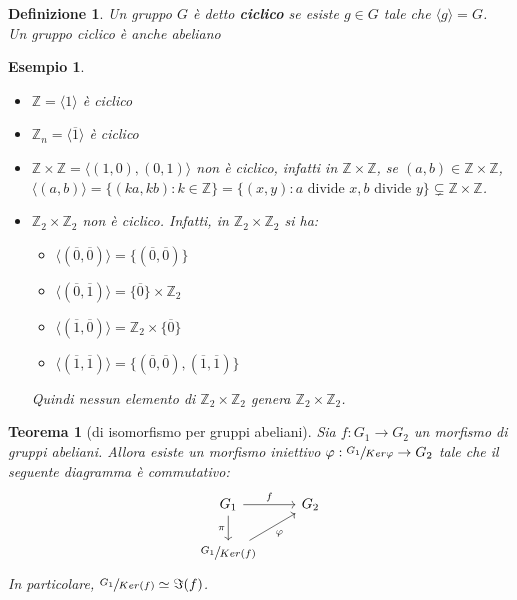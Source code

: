 \documentclass[a4paper,12pt]{article}
\theoremstyle{def}
\newtheorem*{definition}{Definizione}
\theoremstyle{prop}
\theoremstyle{esempio}
\newtheorem*{example}{Esempio}
\theoremstyle{dimostrazione}
\theoremstyle{teo}
\newtheorem*{teorema}{Teorema}
\theoremstyle{osservazione}
\begin{document}
\begin{definition}
    Un gruppo \(G\) è detto \textbf{ciclico} se esiste \(g \in G\) tale che \(\langle g \rangle = G\).\\
    Un gruppo ciclico è anche abeliano
\end{definition}

\begin{example}
    \
    \begin{itemize}
        \item \(\mathbb{Z} = \langle 1 \rangle\) è ciclico
        \item \(\mathbb{Z}_n = \langle \overline{1} \rangle\) è ciclico
        \item \(\mathbb{Z} \times \mathbb{Z} = \langle (1,0), (0,1) \rangle\) non è ciclico,
              infatti in \(\mathbb{Z}  \times \mathbb{Z} \), se \((a,b) \in \mathbb{Z} \times \mathbb{Z} \),
              \(\langle (a,b) \rangle = \{(ka,kb) : k \in \mathbb{Z} \} = \{(x,y) : a \text{ divide } x,b \text{ divide } y\}
              \subsetneq \mathbb{Z} \times \mathbb{Z} \).
        \item \(\mathbb{Z}_2 \times \mathbb{Z}_2\) non è ciclico. Infatti, in \(\mathbb{Z}_2 \times \mathbb{Z}_2\) si ha:
              \
              \begin{itemize}
                  \item \(\langle (\overline{0},\overline{0}) \rangle = \{(\overline{0},\overline{0})\}\)
                  \item \(\langle (\overline{0}, \overline{1}) \rangle = \{\overline{0}\} \times \mathbb{Z}_2\)
                  \item  \(\langle (\overline{1}, \overline{0}) \rangle = \mathbb{Z}_2 \times \{\overline{0}\}\)
                  \item \(\langle (\overline{1}, \overline{1}) \rangle = \{(\overline{0},\overline{0}),(\overline{1},\overline{1})\}\)
              \end{itemize}
              Quindi nessun elemento di \(\mathbb{Z}_2 \times \mathbb{Z}_2\) genera \(\mathbb{Z}_2 \times \mathbb{Z}_2\).
    \end{itemize}
\end{example}

\begin{teorema}[di isomorfismo per gruppi abeliani]
    Sia \(f: G_1 \rightarrow G_2\) un morfismo di gruppi abeliani. Allora esiste un morfismo iniettivo
    \(\varphi : \sfrac{G_1}{Ker \varphi} \rightarrow G_2\) tale che il seguente diagramma è commutativo:
    \[
        \begin{tikzcd}
            G_1 \arrow[r, "f"] \arrow[d, "\pi"'] & G_2 \\
            \sfrac{G_1}{Ker(f)} \arrow[ru, "\varphi"']
        \end{tikzcd}
    \]
    In particolare, \(\sfrac{G_1}{Ker(f)} \simeq \Im(f)\).
\end{teorema}
\end{document}
